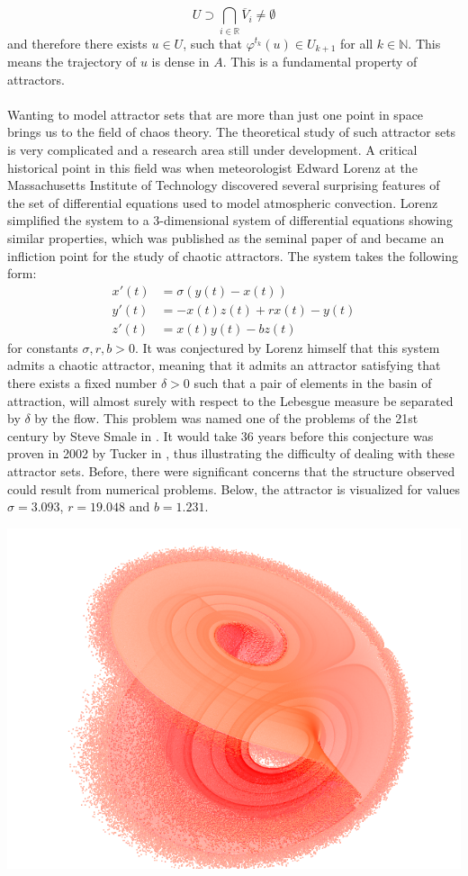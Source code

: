 \documentclass[11pt, a4paper]{memoir}
\theoremstyle{break}
\theoremstyle{break}
\theoremstyle{nonumberplain}
\newcommand{\mN}{\mathbb{N}}
\newcommand{\mR}{\mathbb{R}}
\begin{document}
$$U\supset \bigcap_{i\in \mR} \overline{V}_i\neq \emptyset$$
 and therefore there exists $u\in U$, such that $\varphi^{t_k}(u)\in U_{k+1}$ for all $k\in \mN$. This means the trajectory of $u$ is dense in $A$. This is a fundamental property of attractors.\\\\
Wanting to model attractor sets that are more than just one point in space brings us to the field of chaos theory. The theoretical study of such attractor sets is very complicated and a research area still under development. A critical historical point in this field was when meteorologist Edward Lorenz at the Massachusetts Institute of Technology discovered several surprising features of the set of differential equations used to model atmospheric convection. Lorenz simplified the system to a 3-dimensional system of differential equations showing similar properties, which was published as the seminal paper of \cite{Lorenz} and became an infliction point for the study of chaotic attractors. The system takes the following form:
\begin{align*}
x'(t)&=\sigma(y(t)-x(t))\\
y'(t)&=-x(t)z(t)+rx(t)-y(t)\\
z'(t)&=x(t)y(t)-bz(t)
\end{align*}
for constants $\sigma,r,b>0$. It was conjectured by Lorenz himself that this system admits a chaotic attractor, meaning that it admits an attractor satisfying that there exists a fixed number $\delta >0$ such that a pair of elements in the basin of attraction, will almost surely with respect to the Lebesgue measure be separated by $\delta$ by the flow. This problem was named one of the problems of the 21st century by Steve Smale in \cite{Smale1998}. It would take 36 years before this conjecture was proven in 2002 by Tucker in \cite{Tucker2002}, thus illustrating the difficulty of dealing with these attractor sets. Before, there were significant concerns that the structure observed could result from numerical problems. Below, the attractor is visualized for values $\sigma=3.093$, $r=19.048$ and $b=1.231$.
\begin{center}
	\includegraphics[scale=0.45]{lorenz.png}
\end{center}
\end{document}
